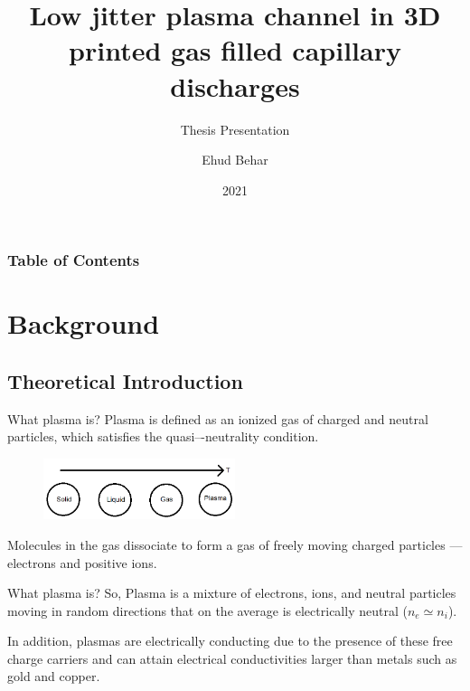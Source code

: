 \documentclass[draft]{beamer}
\title{Low jitter plasma channel in 3D printed gas filled capillary discharges}
\subtitle{Thesis Presentation}
\author{Ehud Behar}
\institute{Hebrew University of Jerusalem}
\date{2021}
\begin{document}
\frame{\titlepage}
\begin{frame}
\frametitle{Table of Contents}
\tableofcontents
\end{frame}

\section{Background}
\subsection{Theoretical Introduction}
\newcommand{\whatisplasma}{What plasma is?}
\begin{frame}{\whatisplasma}
Plasma is defined as an ionized gas of charged and neutral particles, which  satisfies  the quasi–-neutrality condition.
\begin{figure}
    \centering
    \includegraphics[width=0.5\textwidth]{figures/temp_and_states.png}
\end{figure}
Molecules in the gas dissociate to form a gas of freely moving charged particles --- electrons and positive ions.
\end{frame}
\begin{frame}{\whatisplasma}
So, Plasma is a mixture of electrons, ions, and neutral particles moving in random directions that on the average is electrically neutral ($n_e \simeq n_i$).

In addition, plasmas are electrically conducting due to the presence of these free charge carriers and can attain electrical conductivities larger than metals such as gold and copper.
\end{frame}
\newcommand{\debye}{Debye shielding length}
\end{document}
